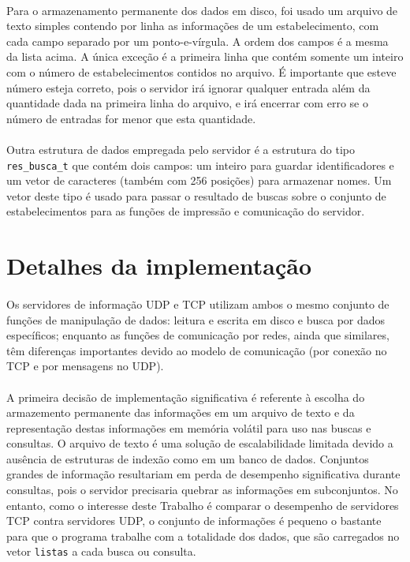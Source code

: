 \documentclass[a4paper,10pt,oneside,final,titlepage,onecolumn]{scrartcl}
\begin{document}
\paragraph{}Para o armazenamento permanente dos dados em disco, foi usado um arquivo de texto simples contendo por linha as informações de um estabelecimento, com cada campo separado por um ponto-e-vírgula. A ordem dos campos é a mesma da lista acima. A única exceção é a primeira linha que contém somente um inteiro com o número de estabelecimentos contidos no arquivo. É importante que esteve número esteja correto, pois o servidor irá ignorar qualquer entrada além da quantidade dada na primeira linha do arquivo, e irá encerrar com erro se o número de entradas for menor que esta quantidade.
\paragraph{}Outra estrutura de dados empregada pelo servidor é a estrutura do tipo \verb|res_busca_t| que contém dois campos: um inteiro para guardar identificadores e um vetor de caracteres (também com 256 posições) para armazenar nomes. Um vetor deste tipo é usado para passar o resultado de buscas sobre o conjunto de estabelecimentos para as funções de impressão e comunicação do servidor.



\FloatBarrier

\section{Detalhes da implementação}
\paragraph{}Os servidores de informação UDP e TCP utilizam ambos o mesmo conjunto de funções de manipulação de dados: leitura e escrita em disco e busca por dados específicos; enquanto as funções de comunicação por redes, ainda que similares, têm diferenças importantes devido ao modelo de comunicação (por conexão no TCP e por mensagens no UDP).
\paragraph{}A primeira decisão de implementação significativa é referente à escolha do armazemento permanente das informações em um arquivo de texto e da representação destas informações em memória volátil para uso nas buscas e consultas. O arquivo de texto é uma solução de escalabilidade limitada devido a ausência de estruturas de indexão como em um banco de dados. Conjuntos grandes de informação resultariam em perda de desempenho significativa durante consultas, pois o servidor precisaria quebrar as informações em subconjuntos. No entanto, como o interesse deste Trabalho é comparar o desempenho de servidores TCP contra servidores UDP, o conjunto de informações é pequeno o bastante para que o programa trabalhe com a totalidade dos dados, que são carregados no vetor \verb|listas| a cada busca ou consulta.
\end{document}
